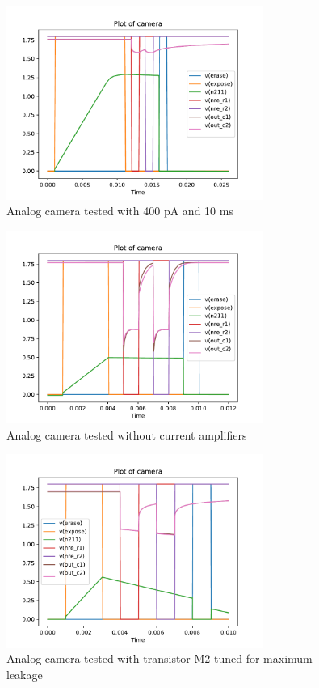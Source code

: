 \begin{figure}[H]
  \centering
  \includegraphics[width=0.75\textwidth]{../analog/camera40010overexposed}
  \caption{Analog camera tested with 400 pA and 10 ms}
  \label{fig:analog40010}
\end{figure}



\begin{figure}[H]
  \centering
  \includegraphics[width=0.75\textwidth]{../analog/camera4003nocurrentamp}
  \caption{Analog camera tested without current amplifiers}
  \label{fig:analog4003nocurrent}
\end{figure}

\begin{figure}[H]
  \centering
  \includegraphics[width=0.75\textwidth]{../analog/cameraLeakingM2}
  \caption{Analog camera tested with transistor M2 tuned for maximum leakage}
  \label{fig:analogLeakingM2}
\end{figure}



